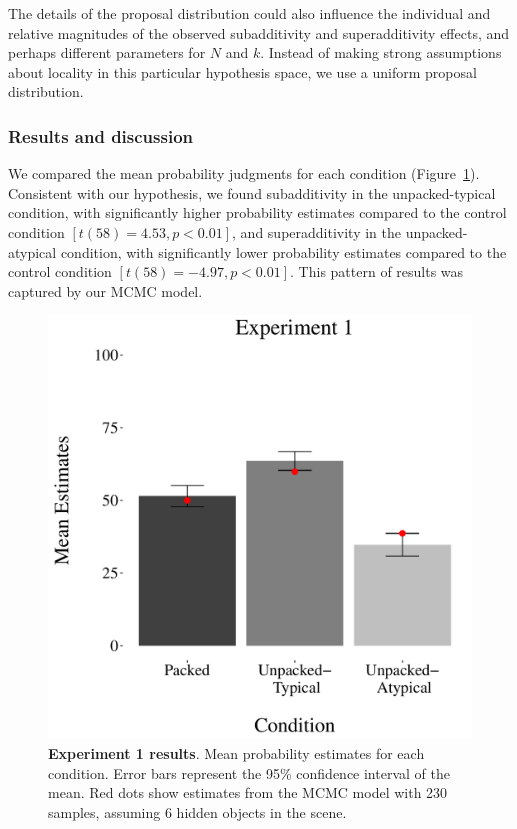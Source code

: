 The details of the proposal distribution could also influence the individual and relative magnitudes of the observed subadditivity and superadditivity effects, and perhaps different parameters for $N$ and $k$. Instead of making strong assumptions about locality in this particular hypothesis space, we use a uniform proposal distribution. 

\subsubsection{Results and discussion}
We compared the mean probability judgments for each condition (Figure~\ref{fig:results1}). Consistent with our hypothesis, we found subadditivity in the unpacked-typical condition, with significantly higher probability estimates compared to the control condition $[t(58)= 4.53, p<0.01]$, and superadditivity in the unpacked-atypical condition, with significantly lower probability estimates compared to the control condition $[t(58)= -4.97, p<0.01]$. This pattern of results was captured by our MCMC model.

\begin{figure}[ht!]
\centering
\includegraphics[scale=0.5]{figures/estimates.pdf}
\caption{\textbf{Experiment 1 results}. Mean probability estimates for each condition. Error bars represent the 95\% confidence interval of the mean. Red dots show estimates from the MCMC model with 230 samples, assuming 6 hidden objects in the scene.}
\label{fig:results1}
\end{figure}


